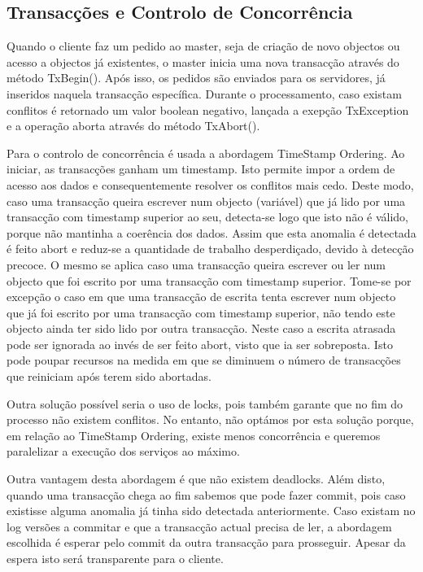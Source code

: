 \subsection{Transacções e Controlo de Concorrência}

Quando o cliente faz um pedido ao master, seja de criação de novo objectos ou acesso a objectos já existentes, o master inicia uma nova transacção através do método TxBegin(). Após isso, os pedidos são enviados para os servidores, já inseridos naquela transacção específica. Durante o processamento, caso existam conflitos é retornado um valor boolean negativo, lançada a exepção TxException e a operação aborta através do método TxAbort(). 

Para o controlo de concorrência é usada a abordagem TimeStamp Ordering. Ao iniciar, as transacções ganham um timestamp. Isto permite impor a ordem de acesso aos dados e consequentemente resolver os conflitos mais cedo. Deste modo, caso uma transacção queira escrever num objecto (variável) que já lido por uma transacção com timestamp superior ao seu, detecta-se logo que isto não é válido, porque não mantinha a coerência dos dados. Assim que esta anomalia é detectada é feito abort e reduz-se a quantidade de trabalho desperdiçado, devido à detecção precoce. O mesmo se aplica caso uma transacção queira escrever ou ler num objecto que foi escrito por uma transacção com timestamp superior. Tome-se por excepção o caso em que uma transacção de escrita tenta escrever num objecto que já foi escrito por uma transacção com timestamp superior, não tendo este objecto ainda ter sido lido por outra transacção. Neste caso a escrita atrasada pode ser ignorada ao invés de ser feito abort, visto que ia ser sobreposta. Isto pode poupar recursos na medida em que se diminuem o número de transacções que reiniciam após terem sido abortadas.

Outra solução possível seria o uso de locks, pois também garante que no fim do processo não existem conflitos. No entanto, não optámos por esta solução porque, em relação ao TimeStamp Ordering, existe menos concorrência e queremos paralelizar a execução dos serviços ao máximo.

Outra vantagem desta abordagem é que não existem deadlocks. Além disto, quando uma transacção chega ao fim sabemos que pode fazer commit, pois caso existisse alguma anomalia já tinha sido detectada anteriormente. Caso existam no log versões a commitar e que a transacção actual precisa de ler, a abordagem escolhida é esperar pelo commit da outra transacção para prosseguir. Apesar da espera isto será transparente para o cliente.
